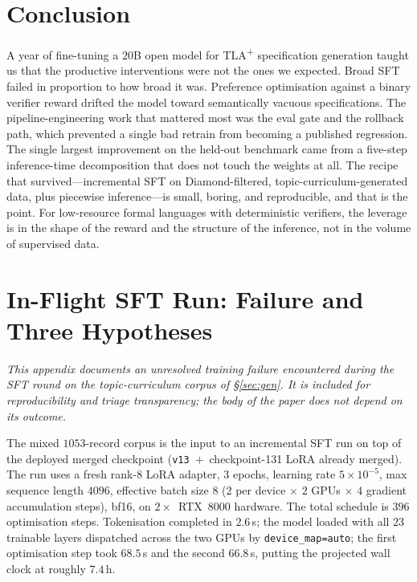 \documentclass[11pt]{article}
\begin{document}
\section{Conclusion}
\label{sec:conclusion}

A year of fine-tuning a $20$B open model for TLA\textsuperscript{+}
specification generation taught us that the productive interventions
were not the ones we expected. Broad SFT failed in proportion to how
broad it was. Preference optimisation against a binary verifier reward
drifted the model toward semantically vacuous specifications. The
pipeline-engineering work that mattered most was the eval gate and the
rollback path, which prevented a single bad retrain from becoming a
published regression. The single largest improvement on the held-out
benchmark came from a five-step inference-time decomposition that does
not touch the weights at all. The recipe that survived---incremental
SFT on Diamond-filtered, topic-curriculum-generated data, plus
piecewise inference---is small, boring, and reproducible, and that is
the point. For low-resource formal languages with deterministic
verifiers, the leverage is in the shape of the reward and the
structure of the inference, not in the volume of supervised data.

\appendix

\section{In-Flight SFT Run: Failure and Three Hypotheses}
\label{sec:sftv3}

\noindent\textit{This appendix documents an unresolved training
failure encountered during the SFT round on the topic-curriculum
corpus of \S\ref{sec:gen}. It is included for reproducibility and
triage transparency; the body of the paper does not depend on its
outcome.}\medskip

The mixed $1053$-record corpus is the input to an incremental SFT run
on top of the deployed merged checkpoint
(\texttt{v13}~$+$~checkpoint-131 LoRA already merged). The run uses a
fresh rank-$8$ LoRA adapter, $3$ epochs, learning rate
$5\!\times\!10^{-5}$, max sequence length $4096$, effective batch size
$8$ ($2$ per device $\times$ $2$ GPUs $\times$ $4$ gradient
accumulation steps), bf16, on $2{\times}$~RTX~8000 hardware. The total
schedule is $396$ optimisation steps. Tokenisation completed in
$2.6$\,s; the model loaded with all $23$ trainable layers dispatched
across the two GPUs by \texttt{device\_map=auto}; the first
optimisation step took $68.5$\,s and the second $66.8$\,s, putting
the projected wall clock at roughly $7.4$\,h.
\end{document}
